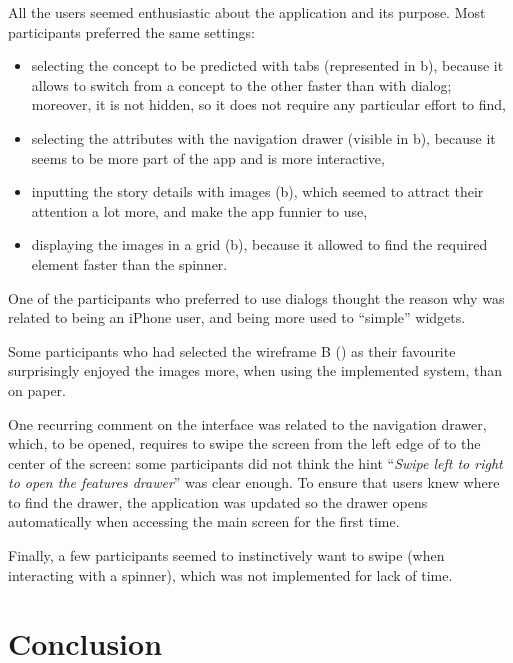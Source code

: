 \documentclass{mproj}
\begin{document}
All the users seemed enthusiastic about the application and its purpose. Most participants preferred the same settings:
\begin{itemize}[topsep=0pt]
	\item selecting the concept to be predicted with tabs (represented in b), because it allows to switch from a concept to the other faster than with dialog; moreover, it is not hidden, so it does not require any particular effort to find,
	\item selecting the attributes with the navigation drawer (visible in b), because it seems to be more part of the app and is more interactive,
	\item inputting the story details with images (b), which seemed to attract their attention a lot more, and make the app funnier to use,
	\item displaying the images in a grid (b), because it allowed to find the required element faster than the spinner.
\end{itemize}

One of the participants who preferred to use dialogs thought the reason why was related to being an iPhone user, and being more used to ``simple'' widgets.

Some participants who had selected the wireframe B () as their favourite surprisingly enjoyed the images more, when using the implemented system, than on paper.

One recurring comment on the interface was related to the navigation drawer, which, to be opened, requires to swipe the screen from the left edge of to the center of the screen: some participants did not think the hint ``\textit{Swipe left to right to open the features drawer}'' was clear enough. To ensure that users knew where to find the drawer, the application was updated so the drawer opens automatically when accessing the main screen for the first time.

Finally, a few participants seemed to instinctively want to swipe (when interacting with a spinner), which was not implemented for lack of time.

\chapter{Conclusion}\label{conclusion}
\end{document}
